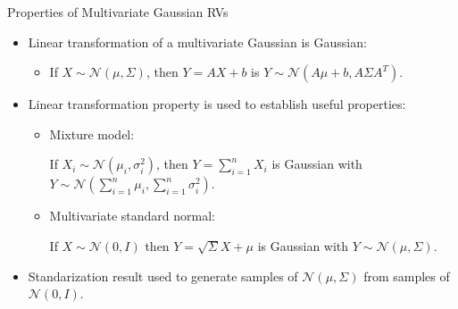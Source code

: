 \documentclass[9pt]{beamer}
\begin{document}
%
\begin{frame}{Properties of Multivariate Gaussian RVs}

\begin{itemize}
\setlength{\itemsep}{5pt}
\item Linear transformation of a multivariate Gaussian is Gaussian: 
\begin{itemize}
\setlength{\itemsep}{5pt}
\item If $X\sim\mathcal{N}(\mu,\Sigma)$, then $Y=AX+b$ is $Y\sim \mathcal{N}(A\mu+b,A\Sigma A^T)$. 
\end{itemize}
\vspace{0.1in}
\item Linear transformation property is used to establish useful properties:
\begin{itemize}
\setlength{\itemsep}{5pt}
\item Mixture model:

 If $X_i\sim \mathcal{N}(\mu_i,\sigma_i^2)$, then $Y=\sum_{i=1}^nX_i$ is Gaussian with $Y\sim\mathcal{N}(\sum_{i=1}^n\mu_i,\sum_{i=1}^n\sigma_i^2)$. 
 \vspace{0.1in}
\item Multivariate standard normal: 

If $X\sim\mathcal{N}(0,{I})$ then $Y=\sqrt{\Sigma}X+\mu$ is Gaussian with $Y\sim\mathcal{N}(\mu,\Sigma)$.
\end{itemize}
\item Standarization result used to generate samples of $\mathcal{N}(\mu,\Sigma)$ from samples of $\mathcal{N}(0,I)$.
\end{itemize}

\end{frame}
\end{document}
